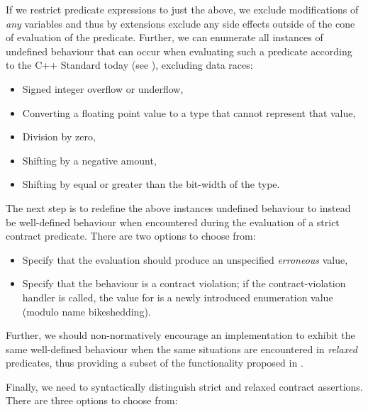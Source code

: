 If we restrict predicate expressions to just the above, we exclude modifications of \emph{any} variables and thus by extensions exclude any side effects outside of the cone of evaluation of the predicate. Further, we can enumerate all instances of undefined behaviour that can occur when evaluating such a predicate according to the C++ Standard today (see \cite{P1705R1}), excluding data races:

\begin{itemize}
\item Signed integer overflow or underflow,
\item Converting a floating point value to a type that cannot represent that value,
\item Division by zero,
\item Shifting by a negative amount,
\item Shifting by equal or greater than the bit-width of the type.
\end{itemize}

The next step is to redefine the above instances undefined behaviour to instead be well-defined behaviour when encountered during the evaluation of a strict contract predicate. There are two options to choose from:

\begin{itemize}
\item Specify that the evaluation should produce an unspecified \emph{erroneous} value,
\item Specify that the behaviour is a contract violation; if the contract-violation handler is called, the value for  is a newly introduced enumeration value  (modulo name bikeshedding).
\end{itemize}

Further, we should non-normatively encourage an implementation to exhibit the same well-defined behaviour when the same situations are encountered in \emph{relaxed} predicates, thus providing a subset of the functionality proposed in \cite{P3100R1}.

Finally, we need to syntactically distinguish strict and relaxed contract assertions. There are three options to choose from:

